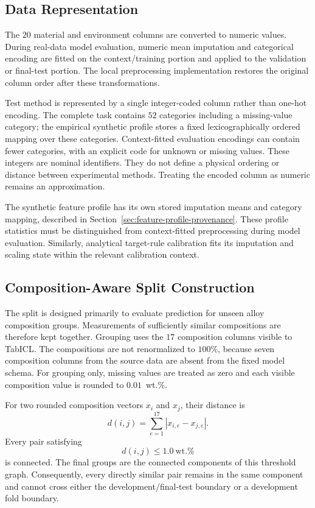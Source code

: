 \documentclass{article}
\begin{document}
\subsection{Data Representation}
\label{sec:data-representation}

The \(20\) material and environment columns are converted to numeric values.
During real-data model evaluation, numeric mean imputation and categorical
encoding are fitted on the context/training portion and applied to the
validation or final-test portion. The local preprocessing implementation
restores the original column order after these transformations.

Test method is represented by a single integer-coded column rather than
one-hot encoding. The complete task contains \(52\) categories including a
missing-value category; the empirical synthetic profile stores a fixed
lexicographically ordered mapping over these categories. Context-fitted
evaluation encodings can contain fewer categories, with an explicit code for
unknown or missing values. These integers are nominal identifiers. They do
not define a physical ordering or distance between experimental methods.
Treating the encoded column as numeric remains an approximation.

The synthetic feature profile has its own stored imputation means and category
mapping, described in Section~\ref{sec:feature-profile-provenance}. These
profile statistics must be distinguished from context-fitted preprocessing
during model evaluation. Similarly, analytical target-rule calibration fits
its imputation and scaling state within the relevant calibration context.

\subsection{Composition-Aware Split Construction}
\label{sec:composition-split}

The split is designed primarily to evaluate prediction for unseen alloy
composition groups. Measurements of sufficiently similar compositions are
therefore kept together. Grouping uses the \(17\) composition columns visible
to TabICL. The compositions are not renormalized to \(100\%\), because seven
composition columns from the source data are absent from the fixed model
schema. For grouping only, missing values are treated as zero and each visible
composition value is rounded to \(0.01\)~wt.\%.

For two rounded composition vectors \(x_i\) and \(x_j\), their distance is
\[
d(i,j)=\sum_{e=1}^{17}|x_{i,e}-x_{j,e}|.
\]
Every pair satisfying
\[
d(i,j)\leq1.0\ \text{wt.\%}
\]
is connected. The final groups are the connected components of this threshold
graph. Consequently, every directly similar pair remains in the same component
and cannot cross either the development/final-test boundary or a development
fold boundary.
\end{document}
